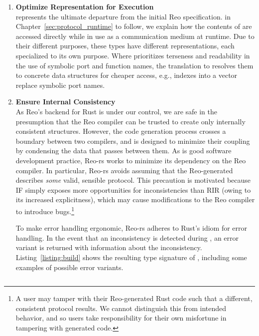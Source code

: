\begin{enumerate}
	\item \textbf{Optimize Representation for Execution}\\
	 represents the ultimate departure from the initial Reo specification. in Chapter~\ref{sec:protocol_runtime} to follow, we explain how the contents of  are accessed directly while in use as a communication medium at runtime. Due to their different purposes, these types have different representations, each specialized to its own purpose. Where  prioritizes terseness and readability in the use of symbolic port and function names, the translation to  resolves them to concrete data structures for cheaper access, e.g., indexes into a vector replace symbolic port names.
	
	\item \textbf{Ensure Internal Consistency}\\
	As Reo's backend for Rust is under our control, we are safe in the presumption that the Reo compiler can be trusted to create only internally consistent  structures. However, the code generation process crosses a boundary between two compilers, and is designed to minimize their coupling by condensing the data that passes between them. As is good software development practice, Reo-rs works to minimize its dependency on the Reo compiler. In particular, Reo-rs avoids assuming that the Reo-generated  describes \textit{some} valid, sensible protocol. This precaution is motivated because IF simply exposes more opportunities for inconsistencies than RIR (owing to its increased explicitness), which may cause modifications to the Reo compiler to introduce bugs.\footnote{A user may tamper with their Reo-generated Rust code such that a different, consistent protocol results. We cannot distinguish this from intended behavior, and so users take responsibility for their own misfortune in tampering with generated code.}
	
	To make error handling ergonomic, Reo-rs adheres to Rust's idiom for error handling. In the event that an inconsistency is detected during , an error variant is returned with information about the inconsistency. Listing~\ref{listing:build}	shows the resulting type signature of , including some examples of possible error variants.
\end{enumerate}


\begin{listing}[ht]
	\centering
	\inputminted[]{rust}{build.rs}
	\caption[TODO.]{Signature of the~ function. Its inputs are (1) an immutable reference to a , which is used to determine the protocol's behavior, and (2) a , which stores initialized memory cells to be incorporated into the protocol's state. The return result is an enumeration type, returning  upon success, and a tuple on failure, whose elements are, respectively (1) the index of the imperative rule where the error occurred, if applicable, and (2) , another sum type communicating the nature of the error with additional information. }
	\label{listing:build}
\end{listing}

